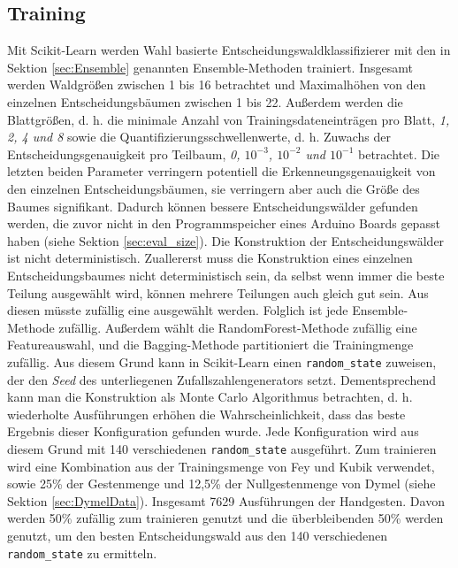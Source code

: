\subsection{Training}
\label{sec:Training}
Mit Scikit-Learn werden Wahl basierte Entscheidungswaldklassifizierer mit den in Sektion \ref{sec:Ensemble} genannten Ensemble-Methoden trainiert. Insgesamt werden Waldgrößen zwischen 1 bis 16 betrachtet und
Maximalhöhen von den einzelnen Entscheidungsbäumen zwischen 1 bis 22. Außerdem werden die Blattgrößen, d. h. die minimale Anzahl von Trainingsdateneinträgen pro Blatt, \textit{1, 2, 4 und 8} sowie die
Quantifizierungsschwellenwerte, d. h. Zuwachs der Entscheidungsgenauigkeit pro Teilbaum, \textit{0, $10^{-3}$, $10^{-2}$ und $10^{-1}$} betrachtet.
\newline
\newline
Die letzten beiden Parameter verringern potentiell die Erkenneungsgenauigkeit von den einzelnen Entscheidungsbäumen, sie verringern aber auch die Größe des Baumes signifikant.
Dadurch können bessere Entscheidungswälder gefunden werden, die zuvor nicht in den Programmspeicher eines Arduino Boards gepasst haben (siehe Sektion \ref{sec:eval_size}).
\newline
\newline
Die Konstruktion der Entscheidungswälder ist nicht deterministisch. Zuallererst muss die Konstruktion eines einzelnen Entscheidungsbaumes nicht deterministisch sein, da selbst wenn immer die beste Teilung
ausgewählt wird, können mehrere Teilungen auch gleich gut sein. Aus diesen müsste zufällig eine ausgewählt werden. Folglich ist jede Ensemble-Methode zufällig. Außerdem wählt die RandomForest-Methode
zufällig eine Featureauswahl, und die Bagging-Methode partitioniert die Trainingmenge zufällig. Aus diesem Grund kann in Scikit-Learn einen \texttt{random\_state} zuweisen, der den \textit{Seed} des
unterliegenen Zufallszahlengenerators setzt.
\newline
\newline
Dementsprechend kann man die Konstruktion als Monte Carlo Algorithmus betrachten, d. h. wiederholte Ausführungen erhöhen die Wahrscheinlichkeit, dass das beste Ergebnis dieser Konfiguration gefunden wurde.
Jede Konfiguration wird aus diesem Grund mit 140 verschiedenen \texttt{random\_state} ausgeführt.
\newline
\newline
Zum trainieren wird eine Kombination aus der Trainingsmenge von Fey und Kubik verwendet, sowie 25\% der Gestenmenge und 12,5\% der Nullgestenmenge von Dymel (siehe Sektion \ref{sec:DymelData}). Insgesamt 7629
Ausführungen der Handgesten. Davon werden 50\% zufällig zum trainieren genutzt und die überbleibenden 50\% werden genutzt, um den besten Entscheidungswald aus den 140 verschiedenen \texttt{random\_state}
zu ermitteln.

